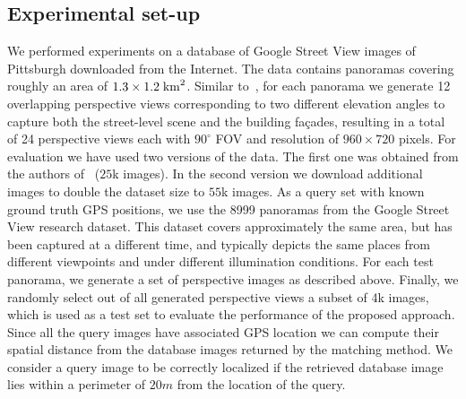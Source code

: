 \documentclass[table]{article} %
\begin{document}
   	\subsection{Experimental set-up}
		We performed experiments on a database of Google Street View images of Pittsburgh downloaded from the Internet. The data contains panoramas covering roughly an area of $1.3 \times 1.2 \; {\rm km}^2$. 		
		Similar to~\cite{Chen11}, for each panorama we generate 12 overlapping perspective views corresponding to two different elevation angles to capture both the street-level scene and the building fa\c{c}ades, resulting in a total of 24 perspective views each with $90^\circ$ FOV and resolution of $960 \times 720$ pixels.
		For evaluation we have used two versions of the data. The first one was obtained from the authors of~\cite{Gronat13} ($25$k images). In the second version we download additional images to double the dataset size to $55$k images. 
		As a query set with known ground truth GPS positions, we use the 8999 panoramas from the Google Street View research dataset. This dataset covers approximately the same area, but has been captured at a different time, and typically depicts the same places from different viewpoints and under different illumination conditions. For each test panorama, we generate a set of perspective images as described above. Finally, we randomly select out of all generated perspective views a subset of 4k images, which is used as a test set to evaluate the performance of the proposed approach.
			Since all the query images have associated GPS location we can compute their spatial distance from the database images returned by the matching method. We consider a query image to be correctly localized if the retrieved database image lies within a perimeter of $20m$ from the location of the query.
\end{document}
